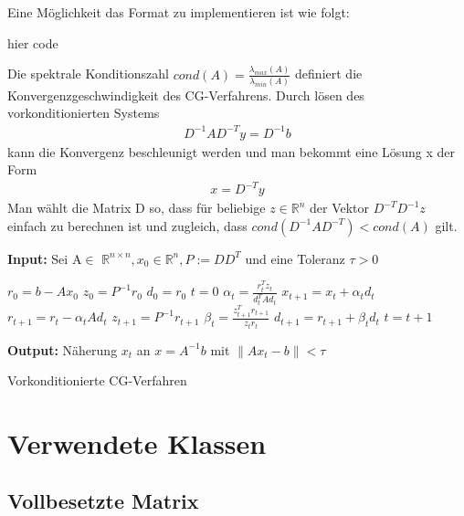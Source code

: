 \documentclass[12pt,a4paper]{scrartcl}
\numberwithin{equation}{section}
\numberwithin{myalgctr}{section}
\numberwithin{mytheoremctr}{subsection}
\numberwithin{mykorollarctr}{subsection}
\numberwithin{mylemmactr}{subsection}
\numberwithin{mybeispielctr}{subsection}
\newcommand\norm[1]{\left\lVert#1\right\rVert}
\begin{document}
	Eine Möglichkeit das Format zu implementieren ist wie folgt:
	
	hier code
	
	Die spektrale Konditionszahl $cond(A) = \frac{\lambda_{max}(A)}{\lambda_{min}(A)}$ definiert die Konvergenzgeschwindigkeit des CG-Verfahrens. Durch lösen des vorkonditionierten Systems
	\begin{align*}
		D^{-1}AD^{-T}y = D^{-1}b
	\end{align*}
	kann die Konvergenz beschleunigt werden und man bekommt eine Lösung x der Form 
	\begin{align*}
		x = D^{-T}y
	\end{align*}
	Man wählt die Matrix D so, dass für beliebige $z \in \mathbb{R}^{n}$ der Vektor $D^{-T}D^{-1}z$ einfach zu berechnen ist und zugleich, dass $cond(D^{-1}AD^{-T}) < cond(A)$ gilt.
	\begin{algorithm}[H]
		\textbf{Input:} Sei A$\in$ $\mathbb{R}^{n\times n}, x_0 \in \mathbb{R}^{n}, P:=DD^{T}$ und eine Toleranz $\tau > 0$
		\begin{algorithmic}[1]
			\State $r_0 = b - Ax_0$
			\State $z_0 = P^{-1}r_0$
			\State $d_0 = r_0$
			\State $t = 0$
			\While{$ \norm{r_t} > \tau $}
			\State $\alpha_t = \frac{r_t^{T}z_t}{d_t^{T}Ad_t}$
			\State $x_{t+1} = x_{t} + \alpha_t d_t$
			\State $r_{t+1} = r_t - \alpha_t Ad_t$
			\State $z_{t+1} = P^{-1}r_{t+1}$
			\State $\beta_t = \frac{z_{t+1}^{T}r_{t+1}}{z_tr_t}$
			\State $d_{t+1} = r_{t+1} + \beta_td_t$
			\State $t = t + 1$
			\EndWhile
		\end{algorithmic}
		\textbf{Output:} Näherung $x_t$ an $x = A^{-1}b$ mit $\norm{Ax_t-b} < \tau$
		
		\caption{Vorkonditionierte CG-Verfahren} \label{alg:vcg}
	\end{algorithm}
	
	\newpage
	\appendix
	\section{Verwendete Klassen}
	\subsection{Vollbesetzte Matrix}
	
	
	\newpage
	\printbibliography
	\listoffigures
	\thispagestyle{firststyle}
	
\end{document}
